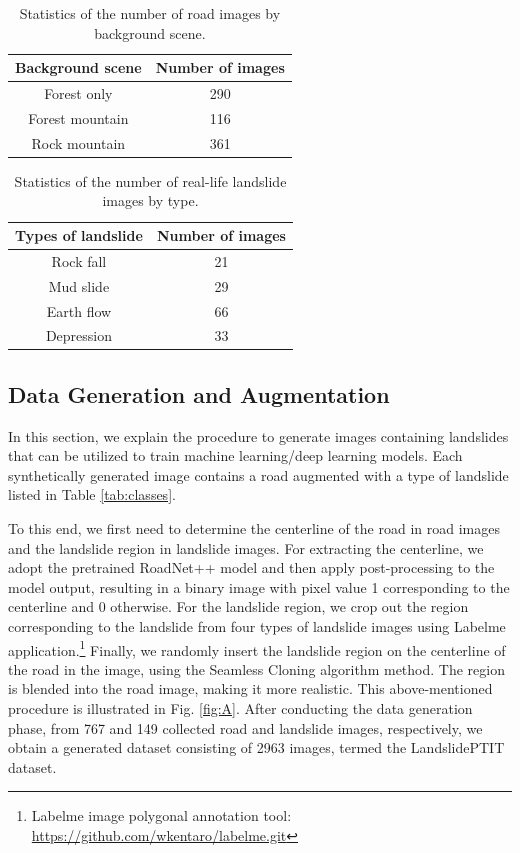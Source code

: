 \documentclass{ieeeaccess}
\begin{document}
\begin{table}[t]
\caption{Statistics of the number of road images by background scene.}
\centering
\begin{tabular}{|c|c|}
\hline
Background scene & Number of images \\ \hline
Forest only      & 290              \\ \hline
Forest mountain  & 116              \\ \hline
Rock mountain    & 361              \\ \hline
\end{tabular}
\label{tab:background-scene-type}
\end{table}

\begin{table}[t]
\caption{Statistics of the number of real-life landslide images by type.}
\centering
\begin{tabular}{|c|c|}
\hline
Types of landslide & Number of images \\ \hline
Rock fall          & 21               \\ \hline
Mud slide          & 29               \\ \hline
Earth flow         & 66               \\ \hline
Depression         & 33               \\ \hline
\end{tabular}
\label{tab:landslide-type}
\end{table}

\subsection{Data Generation and Augmentation}

In this section, we explain the procedure to generate images containing landslides that can be utilized to train machine learning/deep learning models. Each synthetically generated image contains a road augmented with a type of landslide listed in Table \ref{tab:classes}. 

To this end, we first need to determine the centerline of the road in road images and the landslide region in landslide images. For extracting the centerline, we adopt the pretrained RoadNet++ model \cite{liu2019roadnet} and then apply post-processing to the model output, resulting in a binary image with pixel value 1 corresponding to the centerline and 0 otherwise. For the landslide region, we crop out the region corresponding to the landslide from four types of landslide images using Labelme application.\footnote{Labelme image polygonal annotation tool: \url{https://github.com/wkentaro/labelme.git}} Finally, we randomly insert the landslide region on the centerline of the road in the image, using the Seamless Cloning algorithm \cite{matias2016Poisson-Image-Editing} 
method. The region is blended into the road image, making it more realistic. This above-mentioned procedure is illustrated in Fig. \ref{fig:A}. After conducting the data generation phase, from 767 and 149 collected road and landslide images, respectively, we obtain a generated dataset consisting of 2963 images, termed the LandslidePTIT dataset.
\end{document}
